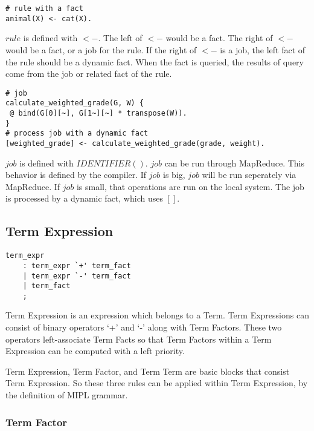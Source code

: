 \documentclass[prodmode,acmtecs]{acmsmall}
\begin{document}
\begin{lstlisting}
# rule with a fact
animal(X) <- cat(X).
\end{lstlisting}

$rule$ is defined with $<-$. The left of $<-$ would be a fact. The right of $<-$
 would be a fact, or a job for the rule. If the right of $<-$ is a job, the left fact
 of the rule should be a dynamic fact. When the fact is queried, the results of query
 come from the job or related fact of the rule.\\

\begin{lstlisting}
# job
calculate_weighted_grade(G, W) {
 @ bind(G[0][~], G[1~][~] * transpose(W)).
}
# process job with a dynamic fact
[weighted_grade] <- calculate_weighted_grade(grade, weight).
\end{lstlisting}

$job$ is defined with $ IDENTIFIER ( ) { }$. $job$ can be run through MapReduce.
 This behavior is defined by the compiler. If $job$ is big, $job$ will be run
 seperately via MapReduce. If $job$ is small, that operations are run on the
 local system. The job is processed by a dynamic fact, which uses $[ ]$.\\


\subsection{Term Expression}
\begin{lstlisting}
term_expr
	: term_expr `+' term_fact
	| term_expr `-' term_fact
	| term_fact
	;
\end{lstlisting}

Term Expression is an expression which belongs to a Term.  Term 
Expressions can consist of binary operators `+' and `-' along with Term
Factors.  These two operators left-associate Term Facts so that Term
Factors within a Term Expression can be computed with a left priority.

Term Expression, Term Factor, and Term Term are basic blocks that
consist Term Expression.  So these three rules can be applied within
Term Expression, by the definition of MIPL grammar.

\subsubsection{Term Factor}
\end{document}
